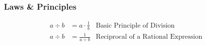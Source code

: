 \documentclass{article}
\begin{document}
    \subsubsection{Laws \& Principles}
    \begin{align*}
        a \div b &= a \cdot \frac{1}{b} &\text{Basic Principle of Division}\\
        a \div b &= \frac{1}{a \div b} &\text{Reciprocal of a Rational Expression}
    \end{align*}

    \clearpage
    
    
\end{document}
